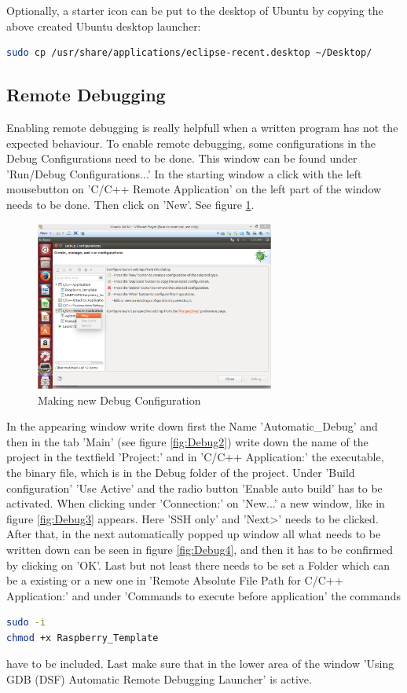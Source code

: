 Optionally, a starter icon can be put to the desktop of Ubuntu by copying the above created Ubuntu desktop launcher:
\begin{lstlisting}[language=bash,otherkeywords={sudo,cp,apt-get,mkdir}]
sudo cp /usr/share/applications/eclipse-recent.desktop ~/Desktop/
\end{lstlisting}

\subsection{Remote Debugging}
\label{subsubsec:subsubsec-RD}

Enabling remote debugging is really helpfull when a written program has not the  expected behaviour. To enable remote debugging, some configurations in the Debug Configurations need to be done. This window can be found under 'Run/Debug Configurations...'
In the starting window a click with the left mousebutton on 'C/C++ Remote Application' on the left part of the window needs to be done. Then click on 'New'. See figure \ref{fig:Debug1}.

\begin{figure}[H]
	\centering\includegraphics[width=0.7\textwidth]{fig/Dev_Concept/Debug1}
	\caption{Making new Debug Configuration}
	\label{fig:Debug1}
\end{figure}

In the appearing window write down first the Name 'Automatic\_Debug' and then in the tab 'Main' (see figure \ref{fig:Debug2}) write down the name of the project in the textfield 'Project:' and in 'C/C++ Application:' the executable, the binary file, which is in the Debug folder of the project. Under 'Build configuration' 'Use Active' and the radio button 'Enable auto build' has to be activated. When clicking under 'Connection:' on 'New...' a new window, like in figure \ref{fig:Debug3} appears. Here 'SSH only' and 'Next>' needs to be clicked. After that, in the next automatically popped up window all what needs to be written down can be seen in figure \ref{fig:Debug4}, and then it has to be confirmed by clicking on 'OK'. Last but not least there needs to be set a Folder which can be a existing or a new one in 'Remote Absolute File Path for C/C++ Application:' and under 'Commands to execute before application' the commands
\begin{lstlisting}[language=bash]
sudo -i
chmod +x Raspberry_Template
\end{lstlisting}
have to be included. Last make sure that in the lower area of the window 'Using GDB (DSF) Automatic Remote Debugging Launcher' is active.

